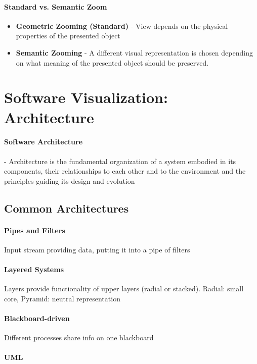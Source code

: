 \documentclass[10pt,a4paper]{article}
\begin{document}
	\paragraph{Standard vs. Semantic Zoom}
	\begin{itemize}
		\item \textbf{Geometric Zooming (Standard)} - View depends on the physical properties of the presented object
		\item \textbf{Semantic Zooming} - A different visual representation is chosen depending on what meaning of the presented object should be preserved.
	\end{itemize}


\section{Software Visualization: Architecture}
	\paragraph{Software Architecture} - Architecture is the fundamental organization of a system embodied in its components, their relationships to each other and to the environment and the principles guiding its design and evolution
	
	\subsection{Common Architectures}
		
		\paragraph{Pipes and Filters} Input stream providing data, putting it into a pipe of filters
		
		\paragraph{Layered Systems} Layers provide functionality of upper layers (radial or stacked). Radial: small core, Pyramid: neutral representation 
		
		\paragraph{Blackboard-driven} Different processes share info on one blackboard
		
		\paragraph{UML}
		
\end{document}
